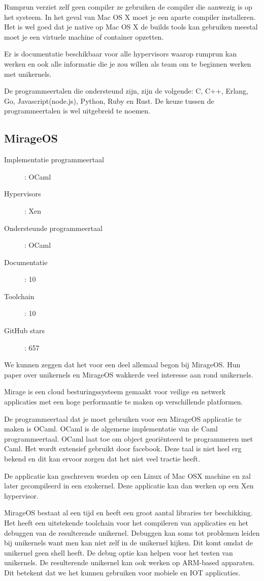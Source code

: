 \documentclass[pdftex,a4paper,12pt,twoside]{report}
\begin{document}
Rumprun verziet zelf geen compiler ze gebruiken de compiler die aanwezig is op het systeem. In het geval van Mac OS X moet je een aparte compiler installeren. Het is wel goed dat je native op Mac OS X de builds tools kan gebruiken meestal moet je een virtuele machine of container opzetten.

Er is documentatie beschikbaar voor alle hypervisors waarop rumprun kan werken en ook alle informatie die je zou willen als team om te beginnen werken met unikernels.

De programmeertalen die ondersteund zijn, zijn de volgende: C, C++, Erlang, Go, Javascript(node.js), Python, Ruby en Rust. De keuze tussen de programmeertalen is wel uitgebreid te noemen.

\subsection{MirageOS}

\begin{description}
  \item [Implementatie programmeertaal]: OCaml
  \item [Hypervisors]: Xen
  \item [Ondersteunde programmeertaal]: OCaml
  \item [Documentatie]: 10
  \item [Toolchain]: 10
  \item [GitHub stars]: 657
\end{description}

We kunnen zeggen dat het voor een deel allemaal begon bij MirageOS. Hun paper over unikernels en MirageOS wakkerde veel interesse aan rond unikernels. 

Mirage is een cloud besturingssysteem gemaakt voor veilige en netwerk applicaties met een hoge performantie te maken op verschillende platformen.

De programmeertaal dat je moet gebruiken voor een MirageOS applicatie te maken is OCaml. OCaml is de algemene implementatie van de Caml programmeertaal. OCaml laat toe om object georiënteerd te programmeren met Caml.  Het wordt extensief gebruikt door facebook. Deze taal is niet heel erg bekend en dit kan ervoor zorgen dat het niet veel tractie heeft.

De applicatie kan geschreven worden op een Linux of Mac OSX machine en zal later gecompileerd in een exokernel. Deze applicatie kan dan werken op een Xen hypervisor.

MirageOS bestaat al een tijd en heeft een groot aantal libraries ter beschikking. Het heeft een uitstekende toolchain voor het compileren van applicaties en het debuggen van de resulterende unikernel. Debuggen kan soms tot problemen leiden bij unikernels want men kan niet zelf in de unikernel kijken. Dit komt omdat de unikernel geen shell heeft. De debug optie kan helpen voor het testen van unikernels. De resulterende unikernel kan ook werken op ARM-based apparaten. Dit betekent dat we het kunnen gebruiken voor mobiele en IOT applicaties.
\end{document}
